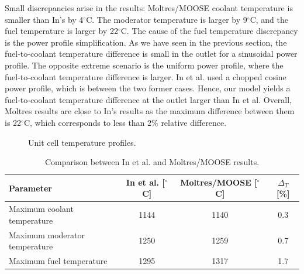 Small discrepancies arise in the results: Moltres/MOOSE coolant temperature is smaller than In's by 4$^{\circ}$C.
The moderator temperature is larger by 9$^{\circ}$C, and the fuel temperature is larger by 22$^{\circ}$C.
The cause of the fuel temperature discrepancy is the power profile simplification.
As we have seen in the previous section, the fuel-to-coolant temperature difference is small in the outlet for a sinusoidal power profile. 
The opposite extreme scenario is the uniform power profile, where the fuel-to-coolant temperature difference is larger.
In et al. used a chopped cosine power profile, which is between the two former cases.
Hence, our model yields a fuel-to-coolant temperature difference at the outlet larger than In et al.
Overall, Moltres results are close to In's results as the maximum difference between them is 22$^{\circ}$C, which corresponds to less than 2\% relative difference.

\begin{figure}[htbp!]
  \centering
  \hfill
  \caption{Unit cell temperature profiles.}
  \label{fig:th-val-unit-temps}
\end{figure}

\begin{table}[htbp!]
\centering
    \caption{Comparison between In et al. \cite{in_three-dimensional_2006} and Moltres/MOOSE results.}
    \label{tab:th-val-unit-results}
    \begin{tabular}{@{}l c c c}
    \toprule
  Parameter                      & In et al. [$^{\circ}$C] & Moltres/MOOSE [$^{\circ}$C] & $\Delta_T$ [\%]\\
    \midrule
  Maximum coolant temperature    & 1144      & 1140          & 0.3 \\
  Maximum moderator temperature  & 1250      & 1259          & 0.7 \\
  Maximum fuel temperature       & 1295      & 1317          & 1.7 \\
    \bottomrule
  \end{tabular}
\end{table}

